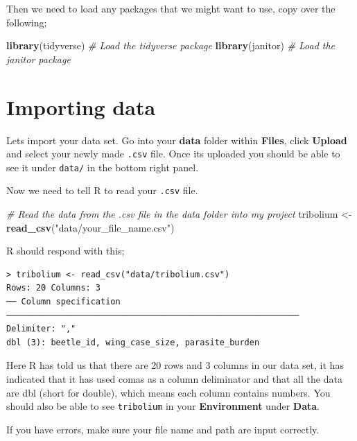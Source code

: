 \documentclass[
]{book}
\newenvironment{Shaded}{\begin{snugshade}}{\end{snugshade}}
\newcommand{\CommentTok}[1]{\textcolor[rgb]{0.56,0.35,0.01}{\textit{#1}}}
\newcommand{\FunctionTok}[1]{\textcolor[rgb]{0.13,0.29,0.53}{\textbf{#1}}}
\newcommand{\NormalTok}[1]{#1}
\newcommand{\OtherTok}[1]{\textcolor[rgb]{0.56,0.35,0.01}{#1}}
\newcommand{\StringTok}[1]{\textcolor[rgb]{0.31,0.60,0.02}{#1}}
\begin{document}
Then we need to load any packages that we might want to use, copy over the following;

\begin{Shaded}
\begin{Highlighting}[]
\FunctionTok{library}\NormalTok{(tidyverse) }\CommentTok{\# Load the tidyverse package}
\FunctionTok{library}\NormalTok{(janitor) }\CommentTok{\# Load the janitor package}
\end{Highlighting}
\end{Shaded}

\hypertarget{importing}{%
\section{Importing data}\label{importing}}

Lets import your data set. Go into your \textbf{data} folder within \textbf{Files}, click \textbf{Upload} and select your newly made \texttt{.csv} file. Once its uploaded you should be able to see it under \texttt{data/} in the bottom right panel.

Now we need to tell R to read your \texttt{.csv} file.

\begin{Shaded}
\begin{Highlighting}[]
\CommentTok{\# Read the data from the .csv file in the data folder into my project}
\NormalTok{tribolium }\OtherTok{\textless{}{-}} \FunctionTok{read\_csv}\NormalTok{(}\StringTok{"data/your\_file\_name.csv"}\NormalTok{) }
\end{Highlighting}
\end{Shaded}

R should respond with this;

\begin{verbatim}
> tribolium <- read_csv("data/tribolium.csv")
Rows: 20 Columns: 3                                                              
── Column specification ───────────────────────────────────────────────────────────
Delimiter: ","
dbl (3): beetle_id, wing_case_size, parasite_burden
\end{verbatim}

Here R has told us that there are 20 rows and 3 columns in our data set, it has indicated that it has used comas as a column deliminator and that all the data are dbl (short for double), which means each column contains numbers. You should also be able to see \texttt{tribolium} in your \textbf{Environment} under \textbf{Data}.

If you have errors, make sure your file name and path are input correctly.
\end{document}

